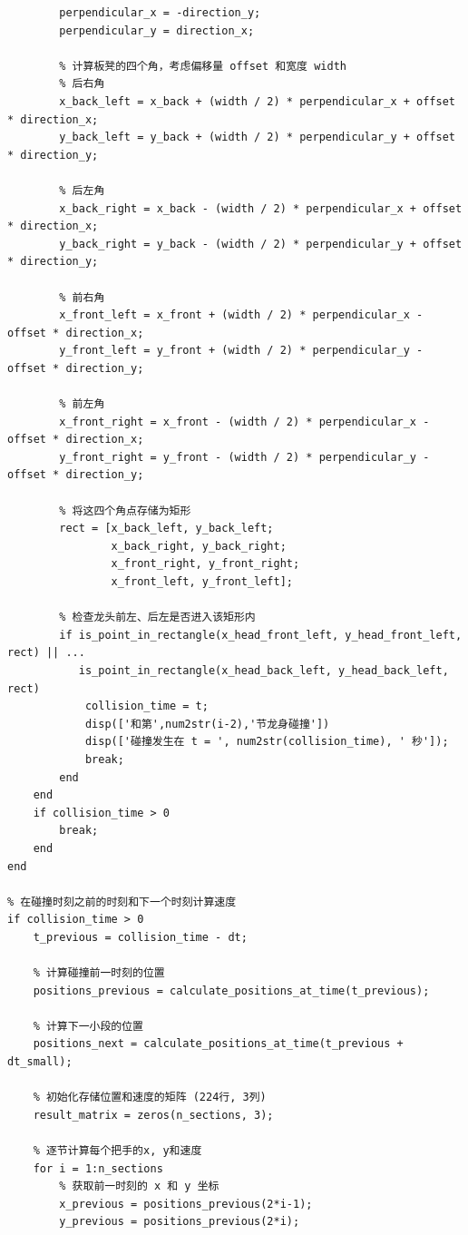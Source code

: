 \documentclass{cumcmthesis1}
\begin{document}
\begin{lstlisting}[caption={求解问题2的代码，将碰撞时间打印到控制台，并将位置，速度等信息写入到result2.xlsx中}, label={lst:second_code}]
        % 垂直方向向量 (用于计算板凳的左右两侧)
        perpendicular_x = -direction_y;
        perpendicular_y = direction_x;
        
        % 计算板凳的四个角，考虑偏移量 offset 和宽度 width
        % 后右角
        x_back_left = x_back + (width / 2) * perpendicular_x + offset * direction_x;
        y_back_left = y_back + (width / 2) * perpendicular_y + offset * direction_y;
        
        % 后左角
        x_back_right = x_back - (width / 2) * perpendicular_x + offset * direction_x;
        y_back_right = y_back - (width / 2) * perpendicular_y + offset * direction_y;
        
        % 前右角
        x_front_left = x_front + (width / 2) * perpendicular_x - offset * direction_x;
        y_front_left = y_front + (width / 2) * perpendicular_y - offset * direction_y;
        
        % 前左角
        x_front_right = x_front - (width / 2) * perpendicular_x - offset * direction_x;
        y_front_right = y_front - (width / 2) * perpendicular_y - offset * direction_y;
        
        % 将这四个角点存储为矩形
        rect = [x_back_left, y_back_left;
                x_back_right, y_back_right;
                x_front_right, y_front_right;
                x_front_left, y_front_left];
        
        % 检查龙头前左、后左是否进入该矩形内
        if is_point_in_rectangle(x_head_front_left, y_head_front_left, rect) || ...
           is_point_in_rectangle(x_head_back_left, y_head_back_left, rect)
            collision_time = t;
            disp(['和第',num2str(i-2),'节龙身碰撞'])
            disp(['碰撞发生在 t = ', num2str(collision_time), ' 秒']);
            break;
        end
    end
    if collision_time > 0
        break;
    end
end

% 在碰撞时刻之前的时刻和下一个时刻计算速度
if collision_time > 0
    t_previous = collision_time - dt;
    
    % 计算碰撞前一时刻的位置
    positions_previous = calculate_positions_at_time(t_previous);
    
    % 计算下一小段的位置
    positions_next = calculate_positions_at_time(t_previous + dt_small);
    
    % 初始化存储位置和速度的矩阵 (224行, 3列)
    result_matrix = zeros(n_sections, 3);
    
    % 逐节计算每个把手的x, y和速度
    for i = 1:n_sections
        % 获取前一时刻的 x 和 y 坐标
        x_previous = positions_previous(2*i-1);
        y_previous = positions_previous(2*i);
        

\end{lstlisting}
\end{document}
